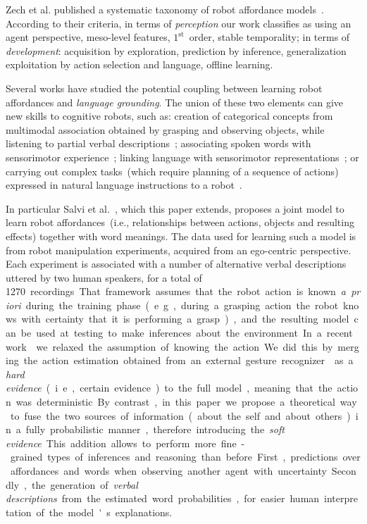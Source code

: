 Zech et al. published a systematic taxonomy of robot affordance models~\cite{zech:2017:ab}.
According to their criteria, in terms of \emph{perception} our work classifies as using
an agent perspective, meso-level features, $1^{\text{st}}$~order, stable temporality;
in terms of \emph{development}: acquisition by exploration, prediction by inference, generalization
exploitation by action selection and language, offline learning.

Several works have studied the potential coupling between learning robot affordances and \emph{language grounding}.
The union of these two elements can give new skills to cognitive robots, such as:
creation of categorical concepts from multimodal association obtained by grasping and observing objects, while listening to partial verbal descriptions~\cite{nakamura:2009:iros,araki:2012:iros};
associating spoken words with sensorimotor experience~\cite{salvi:2012:smcb,morse:2016:cogsci};
linking language with sensorimotor representations~\cite{stramandinoli:2016:icdl}; or
carrying out complex tasks~(which require planning of a sequence of actions) expressed in natural language instructions to a robot~\cite{antunes:2016:icra}.

In particular Salvi et al.~\cite{salvi:2012:smcb}, which this paper extends, proposes a joint model to learn robot affordances~(i.e., relationships between actions, objects and resulting effects) together with word meanings.
The data used for learning such a model is from robot manipulation experiments, acquired from an ego-centric perspective.
Each experiment is associated with a number of alternative verbal descriptions uttered by two human speakers, for a total of \SI{1270}~recordings.
That framework assumes that the robot action is known \emph{a~priori} during the training phase~(e.g., during a grasping action the robot knows with certainty that it is performing a grasp), and the resulting model can be used at testing to make inferences about the environment.
In a recent work~\cite{saponaro:2017:glu} we relaxed the assumption of knowing the action.
We did this by merging the action estimation obtained from an external gesture recognizer~\cite{saponaro:2013:crhri} as a \emph{hard evidence}~(i.e., certain evidence) to the full model, meaning that the action was deterministic.
By contrast, in this paper we propose a theoretical way to fuse the two sources of information~(about the self and about others) in a fully probabilistic manner, therefore introducing the \emph{soft evidence}.
This addition allows to perform more fine-grained types of inferences and reasoning than before.
First, predictions over affordances and words when observing another agent with uncertainty.
Secondly, the generation of \emph{verbal descriptions} from the estimated word probabilities, for easier human interpretation of the model's explanations.
